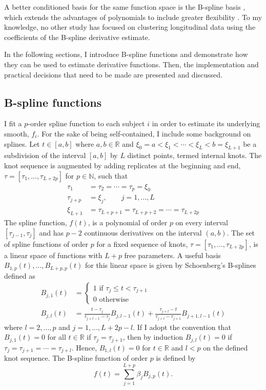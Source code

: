 A better conditioned basis for the same function space is the B-spline basis \cite{deboor1978, schumaker1981,curry1966, de1976}, which extends the advantages of polynomials to include greater flexibility \cite{abraham2003}. To my knowledge, no other study has focused on clustering longitudinal data using the coefficients of the B-spline derivative estimate.

In the following sections, I introduce B-spline functions and demonstrate how they can be used to estimate derivative functions. Then, the implementation and practical decisions that need to be made are presented and discussed.

\subsection{B-spline functions}\label{sec:bsplines}
I fit a $p$-order spline function to each subject $i$ in order to estimate its underlying smooth, $f_i$. For the sake of being self-contained, I include some background on splines. Let $t\in[a,b]$ where $a,b\in\mathbb{R}$ and $\xi_0=a<\xi_{1}<\cdots<\xi_{L} < b = \xi_{L+1}$ be a subdivision of  the interval $[a,b]$ by $L$ distinct points, termed internal knots. The knot sequence is augmented by adding replicates at the beginning and end, $\tau=[\tau_{1},...,\tau_{L+2p}]$ for $p\in\mathbb{N}$, such that 
\begin{align*}
\tau_{1}&=\tau_{2}=\cdots =\tau_{p} =\xi_{0}\\
\tau_{j+p}& = \xi_{j}, \quad\quad j=1,...,L\\
\xi_{L+1}&=\tau_{L+p+1}=\tau_{L+p+2}=\cdots =\tau_{L+2p} 
\end{align*}
The spline function, $f(t)$, is a polynomial of order $p$ on every interval $[\tau_{j-1},\tau_{j}]$ and has $p-2$ continuous derivatives on the interval $(a,b)$. The set of spline functions of order $p$ for a fixed sequence of knots, $\tau = [\tau_1,...,\tau_{L+2p}]$, is a linear space of functions with $L+p$ free parameters. A useful basis $B_{1,p}(t),...,B_{L+p,p}(t)$ for this linear space is given by Schoenberg's B-splines \cite{curry1966, de1976} defined as
\begin{align*}
B_{j,1}(t) &= \begin{cases}
1 \text{ if }\tau_j\leq t < \tau_{j+1}\\
0\text{ otherwise}
\end{cases}\\
B_{j,l}(t) &= \frac{t-\tau_j}{\tau_{j+l-1}-\tau_j} B_{j,l-1}(t)+\frac{\tau_{j+l}-t}{\tau_{j+l}-\tau_{j+1}} B_{j+1,l-1}(t)
\end{align*}
where $l=2,...,p$ and $j=1,...,L+2p-l$.  If I adopt the convention that $B_{j,1}(t)=0$ for all $t\in\mathbb{R}$ if $\tau_{j}=\tau_{j+1}$, then by induction $B_{j,l}(t)=0$ if $\tau_{j}=\tau_{j+1}=\cdots=\tau_{j+l}$. Hence, $B_{1,l}(t)=0$ for $t\in\mathbb{R}$ and $l<p$ on the defined knot sequence. The B-spline function of order $p$ is defined by
$$f(t) = \sum^{L+p}_{j=1} \beta_j B_{j,p}(t).$$

